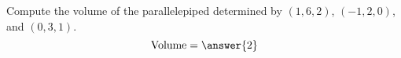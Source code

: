 \begin{problem}
Compute the volume of the parallelepiped determined by $(1,6,2)$, $(-1,2,0)$, and $(0,3,1)$.
\[
\textrm{Volume} = \answer{2}
\]
\end{problem}
